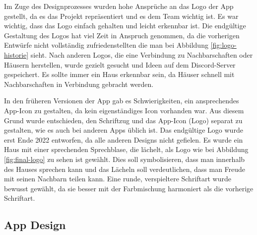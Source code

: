 Im Zuge des Designprozesses wurden hohe Ansprüche an das
Logo der App gestellt, da es das Projekt repräsentiert und
es dem Team wichtig ist. Es
war wichtig, dass das Logo einfach gehalten und leicht
erkennbar ist. Die endgültige Gestaltung des Logos hat viel Zeit
in Anspruch genommen, da die vorherigen Entwürfe nicht
vollständig zufriedenstellten die man bei Abbildung
\ref{fig:logo-historie} sieht. Nach anderen Logos, die eine
Verbindung zu Nachbarschaften oder Häusern herstellen, wurde
gezielt gesucht und Ideen auf dem Discord-Server
gespeichert. Es sollte immer ein Haus erkennbar sein, da
Häuser schnell mit Nachbarschaften in Verbindung gebracht
werden.

In den früheren Versionen der App gab es Schwierigkeiten,
ein ansprechendes App-Icon zu gestalten, da kein
eigenständiges Icon vorhanden war. Aus diesem Grund wurde
entschieden, den Schriftzug und das App-Icon (Logo) separat
zu gestalten, wie es auch bei anderen Apps üblich ist. Das
endgültige Logo wurde erst Ende 2022 entworfen, da alle
anderen Designs nicht gefielen. Es wurde ein Haus mit einer
sprechenden Sprechblase, die lächelt, als Logo
wie bei Abbildung \ref{fig:final-logo} zu sehen ist gewählt. Dies soll symbolisieren, dass
man innerhalb des Hauses sprechen kann und das Lächeln soll
verdeutlichen, dass man Freude mit seinen Nachbarn teilen
kann. Eine runde, verspieltere Schriftart wurde bewusst
gewählt, da sie besser mit der Farbmischung harmoniert als
die vorherige Schriftart.



\subsection{App Design}
